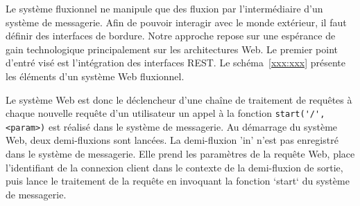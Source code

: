 Le système fluxionnel ne manipule que des fluxion par l'intermédiaire d'un système de messagerie. Afin de pouvoir interagir avec le monde extérieur, il faut définir des interfaces de bordure. Notre approche repose sur une espérance de gain technologique principalement sur les architectures Web. Le premier point d'entré visé est l'intégration des interfaces REST.
Le schéma~\ref{xxx:xxx} présente les éléments d'un système Web fluxionnel.


Le système Web est donc le déclencheur d'une chaîne de traitement de requêtes à chaque nouvelle requête d'un utilisateur un appel à la fonction \lstinline|start('/', <param>)| est réalisé dans le système de messagerie.
Au démarrage du système Web, deux demi-fluxions sont lancées.
La demi-fluxion 'in' n'est pas enregistré dans le système de messagerie.
Elle prend les paramètres de la requête Web, place l'identifiant de la connexion client dans le contexte de la demi-fluxion de sortie, puis lance le traitement de la requête en invoquant la fonction `start` du système de messagerie.

